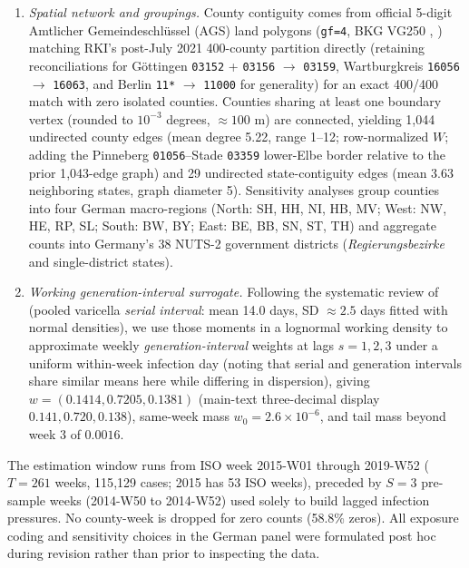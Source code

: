 \begin{enumerate}
14 federal states rotate their summer holiday start weeks across ISO weeks 25--31 over 2015--2019,
Baden-W\"urttemberg (\texttt{08}, 44 counties) and Bavaria (\texttt{09}, 96 counties) always start
last (ranks 15--16, ISO weeks 30--31) in all five years without rotation.
\item \emph{Spatial network and groupings.} County contiguity comes from official 5-digit Amtlicher
Gemeindeschl\"ussel (AGS) land polygons (\texttt{gf=4}, BKG VG250 ,
) matching RKI's post-July 2021 400-county partition directly (retaining
reconciliations for G\"ottingen \texttt{03152} + \texttt{03156} $\to$ \texttt{03159}, Wartburgkreis
\texttt{16056} $\to$ \texttt{16063}, and Berlin \texttt{11*} $\to$ \texttt{11000} for generality) for an
exact 400/400 match with zero isolated counties. Counties sharing at least one boundary vertex
(rounded to $10^{-3}$ degrees, $\approx 100$ m) are connected, yielding 1{,}044 undirected county
edges (mean degree 5.22, range 1--12; row-normalized $W$; adding the Pinneberg \texttt{01056}--Stade
\texttt{03359} lower-Elbe border relative to the prior 1{,}043-edge graph) and 29 undirected
state-contiguity edges (mean 3.63 neighboring states, graph diameter 5). Sensitivity analyses group counties into four German macro-regions (North: SH, HH, NI, HB, MV; West: NW, HE,
RP, SL; South: BW, BY; East: BE, BB, SN, ST, TH) and aggregate counts into Germany's 38 NUTS-2
government districts (\emph{Regierungsbezirke} and single-district states).
\item \emph{Working generation-interval surrogate.} Following the systematic review of
\citet{vink2014serial} (pooled varicella \emph{serial interval}: mean 14.0 days, SD $\approx 2.5$
days fitted with normal densities), we use those moments in a lognormal working density to
approximate weekly \emph{generation-interval} weights at lags $s=1,2,3$ under a uniform within-week
infection day (noting that serial and generation intervals share similar means here while differing
in dispersion), giving $w=(0.1414,0.7205,0.1381)$ (main-text three-decimal display
$0.141,0.720,0.138$), same-week mass $w_0=2.6\times 10^{-6}$, and tail mass beyond week 3 of
$0.0016$.
\end{enumerate}

The estimation window runs from ISO week 2015-W01 through 2019-W52 ($T=261$ weeks, 115{,}129 cases;
2015 has 53 ISO weeks), preceded by $S=3$ pre-sample weeks (2014-W50 to 2014-W52) used solely to
build lagged infection pressures. No county-week is dropped for zero counts (58.8\% zeros). All
exposure coding and sensitivity choices in the German panel were formulated post hoc during
revision rather than prior to inspecting the data.


